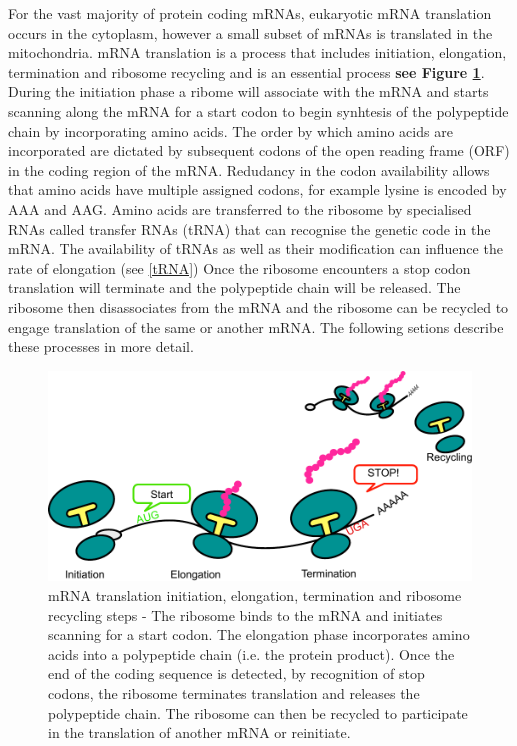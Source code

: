 \documentclass[12pt,openany]{book}
\begin{document}
For the vast majority of protein coding mRNAs, eukaryotic mRNA
translation occurs in the cytoplasm, however a small subset of mRNAs is
translated in the mitochondria. mRNA translation is a process that
includes initiation, elongation, termination and ribosome recycling and
is an essential process \textbf{see Figure \ref{fig:doodlemRNASteps}}.
During the initiation phase a ribome will associate with the mRNA and
starts scanning along the mRNA for a start codon to begin synhtesis of
the polypeptide chain by incorporating amino acids. The order by which
amino acids are incorporated are dictated by subsequent codons of the
open reading frame (ORF) in the coding region of the mRNA. Redudancy in
the codon availability allows that amino acids have multiple assigned
codons, for example lysine is encoded by AAA and AAG. Amino acids are
transferred to the ribosome by specialised RNAs called transfer RNAs
(tRNA) that can recognise the genetic code in the mRNA. The availability
of tRNAs as well as their modification can influence the rate of
elongation (see \ref{tRNA}) Once the ribosome encounters a stop codon
translation will terminate and the polypeptide chain will be released.
The ribosome then disassociates from the mRNA and the ribosome can be
recycled to engage translation of the same or another mRNA. The
following setions describe these processes in more detail.

\begin{figure}
  \includegraphics{./figures/doodleTranslation.pdf}
  \caption{mRNA translation initiation, elongation, termination and ribosome recycling steps - The ribosome binds to the mRNA and initiates scanning for a start codon. The elongation phase incorporates amino acids into a polypeptide chain (i.e. the protein product). Once the end of the coding sequence is detected, by recognition of stop codons, the ribosome terminates translation and releases the polypeptide chain. The ribosome can then be recycled to participate in the translation of another mRNA or reinitiate. \label{fig:doodlemRNASteps}}
\end{figure}
\end{document}
